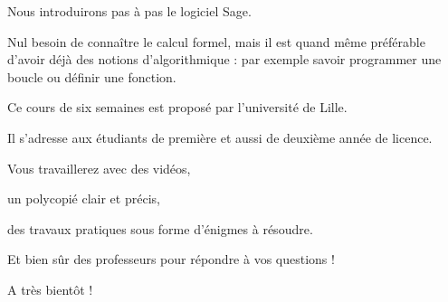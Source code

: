 \change

Nous 
introduirons pas à pas le logiciel Sage. 

\change

Nul besoin de connaître le calcul formel, mais
il est quand même préférable d'avoir déjà des notions d'algorithmique :
par exemple savoir programmer une boucle ou définir une fonction.



\change


\change

Ce cours de six semaines est proposé par l'université de Lille.

Il s'adresse aux étudiants de première et aussi de deuxième année de licence.

\change

Vous travaillerez avec des vidéos,

\change

un polycopié clair et précis,


\change

des travaux pratiques sous forme d'énigmes à résoudre.


\change

Et bien sûr des professeurs pour répondre à vos questions !

A très bientôt !


